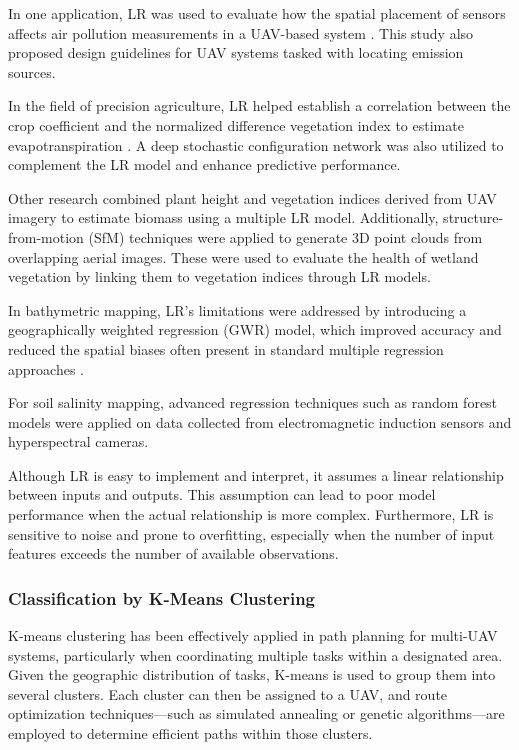 In one application, LR was used to evaluate how the spatial placement of sensors affects air pollution measurements in a UAV-based system \cite{villa2016uav}. This study also proposed design guidelines for UAV systems tasked with locating emission sources.

In the field of precision agriculture, LR helped establish a correlation between the crop coefficient and the normalized difference vegetation index to estimate evapotranspiration \cite{niu2020estimating}. A deep stochastic configuration network was also utilized to complement the LR model and enhance predictive performance.

Other research combined plant height and vegetation indices derived from UAV imagery to estimate biomass using a multiple LR model. Additionally, structure-from-motion (SfM) techniques were applied to generate 3D point clouds from overlapping aerial images. These were used to evaluate the health of wetland vegetation by linking them to vegetation indices through LR models.

In bathymetric mapping, LR’s limitations were addressed by introducing a geographically weighted regression (GWR) model, which improved accuracy and reduced the spatial biases often present in standard multiple regression approaches .

For soil salinity mapping, advanced regression techniques such as random forest models were applied on data collected from electromagnetic induction sensors and hyperspectral cameras.

Although LR is easy to implement and interpret, it assumes a linear relationship between inputs and outputs. This assumption can lead to poor model performance when the actual relationship is more complex. Furthermore, LR is sensitive to noise and prone to overfitting, especially when the number of input features exceeds the number of available observations.



\subsubsection{Classification by K-Means Clustering}

K-means clustering has been effectively applied in path planning for multi-UAV systems, particularly when coordinating multiple tasks within a designated area. Given the geographic distribution of tasks, K-means is used to group them into several clusters. Each cluster can then be assigned to a UAV, and route optimization techniques—such as simulated annealing or genetic algorithms—are employed to determine efficient paths within those clusters.

